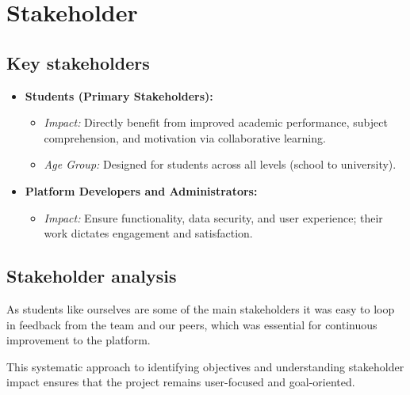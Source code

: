\section{Stakeholder}
\label{sect:stakeholder}

\subsection{Key stakeholders}
\begin{itemize}
    \item \textbf{Students (Primary Stakeholders):}
    \begin{itemize}
        \item \textit{Impact:} Directly benefit from improved academic performance, subject comprehension, and motivation via collaborative learning.
        \item \textit{Age Group:} Designed for students across all levels (school to university).
    \end{itemize}
    
    \item \textbf{Platform Developers and Administrators:}
    \begin{itemize}
        \item \textit{Impact:} Ensure functionality, data security, and user experience; their work dictates engagement and satisfaction.
    \end{itemize}
\end{itemize}  

\subsection{Stakeholder analysis}
As students like ourselves are some of the main stakeholders it was easy to loop in feedback from the team and our peers, which was essential for continuous improvement to the platform.

This systematic approach to identifying objectives and understanding stakeholder impact ensures that the project remains user-focused and goal-oriented.


